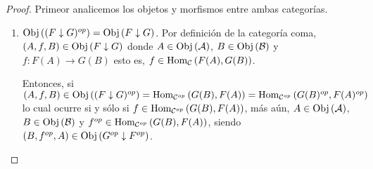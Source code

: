 \documentclass[12pt]{report}
\newcounter{it}
\theoremstyle{largebreak}
\newcommand\cf[3]{\ensuremath{#1:#2\rightarrow#3}}
\newcommand{\Obj}[1]{\ensuremath{\textup{Obj}\left(#1\right)}}
\newcommand{\Hom}[3]{\ensuremath{\textup{Hom}_{#1}\left(#2,#3\right)}}
\begin{document}
    \begin{proof}
        Primeor analicemos los objetos y morfismos entre ambas categorías.
        \begin{enumerate}
            \item $\Obj{(F\downarrow G)^{op}}=\Obj{F\downarrow G}$.
            Por definición de la categoría coma, $(A,f,B)\in\Obj{F\downarrow G}$ donde $A\in\Obj{\mathcal{A}}$, $B\in\Obj{\mathcal{B}}$ y $\cf{f}{F(A)}{G(B)}$ esto es, $f\in\Hom{\mathcal{C}}{F(A)}{G(B)}$.

            Entonces, si $(A,f,B)\in\Obj{(F\downarrow G)^{op}}=\Hom{\mathcal{C}^{op}}{G(B)}{F(A)}=\Hom{\mathcal{C}^{op}}{G(B)^{op}}{F(A)^{op}}$ lo cual ocurre si y sólo si $f\in\Hom{\mathcal{C}^{op}}{G(B)}{F(A)}$, más aún, $A\in\Obj{\mathcal{A}}$, $B\in\Obj{\mathcal{B}}$ y $f^{op}\in\Hom{\mathcal{C}^{op}}{G(B)}{F(A)}$, siendo $(B,f^{op},A)\in\Obj{G^{op}\downarrow F^{op}}$. 


\end{enumerate}
\end{proof}
\end{document}
